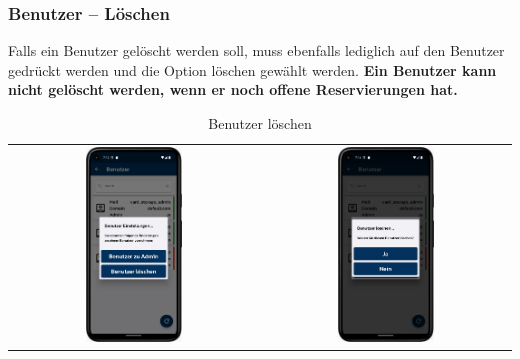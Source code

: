\newpage

\subsubsection{Benutzer – Löschen} \label{subsubsec:deleteUser}
Falls ein Benutzer gelöscht werden soll, muss ebenfalls lediglich auf den Benutzer gedrückt werden und die Option löschen gewählt werden. \textbf{Ein Benutzer kann nicht gelöscht werden, wenn er noch offene Reservierungen hat.}

\vspace{1cm}
\begin{table}[htbp]
  \centering
  \begin{tabular}{cc}
    \includegraphics[width=0.4\textwidth]{FLUTTER/images/ZB/user_page_selector.png} &
    \includegraphics[width=0.4\textwidth]{FLUTTER/images/ZB/user_delete.png} \\
  \end{tabular}
  \label{tab:example}
  \captionsetup{type=figure}
  \caption{Benutzer löschen}
\end{table}

